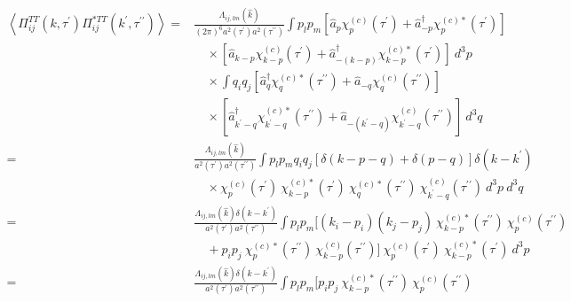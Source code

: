 \begin{equation*}
    \begin{split}
        \left\langle \Pi^{TT}_{ij} \left( k, \tau^{\prime} \right) \Pi^{*TT}_{ij} \left( k^\prime, \tau^{\prime \prime} \right) \right\rangle  =& \frac{\Lambda_{ij,lm} (\hat{k})}{(2 \pi)^6 a^2 \left( \tau^\prime \right) a^2 \left( \tau^{\prime \prime} \right)} \int p_l p_m \left[ \hat{a}_p \chi^{(c)}_p (\tau^\prime) + \hat{a}^\dagger_{-p} \chi^{(c) *}_p (\tau^\prime) \right] \\
        &\quad \times \left[ \hat{a}_{k - p} \chi^{(c)}_{k - p} (\tau^\prime) + \hat{a}^\dagger_{-(k - p)} \chi^{(c) *}_{k - p} (\tau^\prime) \right] ~ d^3 p \\
        &\quad \times \int q_i q_j \left[ \hat{a}_q^\dagger \chi^{(c) *}_q \left( \tau^{\prime \prime} \right) + \hat{a}_{-q} \chi^{(c)}_q \left( \tau^{\prime \prime} \right) \right] \\
        &\quad \times \left[ \hat{a}^\dagger_{k^\prime - q} \chi^{(c) *}_{k^\prime - q} \left( \tau^{\prime \prime} \right) + \hat{a}_{-(k^\prime - q)} \chi^{(c)}_{k^\prime - q} \left( \tau^{\prime \prime} \right) \right] ~ d^3 q\\
        =& \frac{\Lambda_{ij,lm} (\hat{k})}{a^2 \left( \tau^\prime \right) a^2 \left( \tau^{\prime \prime} \right)} \int p_l p_m q_i q_j \left[ \delta (k - p - q) + \delta (p - q) \right] \delta \left( k - k^\prime  \right)\\
        &\quad \times \chi^{(c)}_{p} (\tau^\prime) ~ \chi_{k - p}^{(c) *} (\tau^\prime) ~ \chi^{(c) *}_{q} (\tau^{\prime \prime}) ~ \chi^{(c)}_{k^\prime - q} (\tau^{\prime \prime})  ~ d^3 p ~ d^3 q\\
        =& \frac{\Lambda_{ij,lm} (\hat{k}) \delta \left( k - k^\prime \right)}{a^2 \left( \tau^\prime \right) a^2 \left( \tau^{\prime \prime} \right)} \int p_l p_m \Big[ (k_i - p_i)(k_j - p_j) ~ \chi^{(c) *}_{k - p} (\tau^{\prime \prime}) ~ \chi^{(c)}_{p} (\tau^{\prime \prime}) \\
        &\quad + p_i p_j ~ \chi^{(c) *}_{p} (\tau^{\prime \prime}) ~ \chi^{(c)}_{k - p} (\tau^{\prime \prime}) \Big] ~ \chi^{(c)}_{p} (\tau^\prime) ~ \chi_{k - p}^{(c) *} (\tau^\prime) ~ d^3 p\\
        =& \frac{\Lambda_{ij,lm} (\hat{k}) \delta \left( k - k^\prime \right)}{a^2 \left( \tau^\prime \right) a^2 \left( \tau^{\prime \prime} \right)} \int p_l p_m \Big[ p_i p_j ~ \chi^{(c) *}_{k - p} (\tau^{\prime \prime}) ~ \chi^{(c)}_{p} (\tau^{\prime \prime}) \\

\end{split}
\end{equation*}
